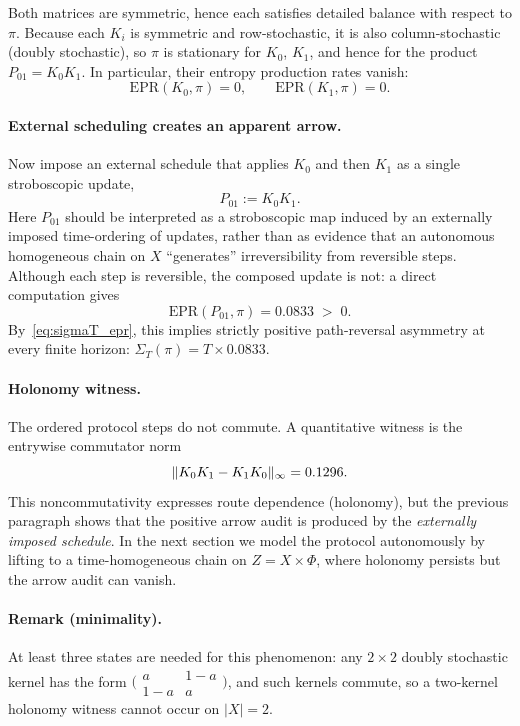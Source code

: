 \documentclass[11pt]{article}
\newcommand{\EprKZero}{0}
\newcommand{\EprKOne}{0}
\newcommand{\EprStrobeRound}{\ensuremath{0.0833}}
\begin{document}
Both matrices are symmetric, hence each satisfies detailed balance with respect to \(\pi\).
Because each \(K_i\) is symmetric and row-stochastic, it is also column-stochastic (doubly stochastic), so \(\pi\) is stationary for \(K_0\), \(K_1\), and hence for the product \(P_{01}=K_0K_1\).
In particular, their entropy production rates vanish:
\[
\mathrm{EPR}(K_0,\pi)=\EprKZero,\qquad
\mathrm{EPR}(K_1,\pi)=\EprKOne.
\]

\paragraph{External scheduling creates an apparent arrow.}
Now impose an external schedule that applies \(K_0\) and then \(K_1\) as a single stroboscopic update,
\[
P_{01}:=K_0K_1.
\]
Here \(P_{01}\) should be interpreted as a stroboscopic map induced by an externally imposed time-ordering of updates, rather than as evidence that an autonomous homogeneous chain on \(X\) ``generates'' irreversibility from reversible steps.
Although each step is reversible, the composed update is not: a direct computation gives
\[
\mathrm{EPR}(P_{01},\pi)=\EprStrobeRound \;>\; 0.
\]
By~\eqref{eq:sigmaT_epr}, this implies strictly positive path-reversal asymmetry at every finite horizon:
\(\Sigma_T(\pi)=T\times\EprStrobeRound\).

\paragraph{Holonomy witness.}
The ordered protocol steps do not commute. A quantitative witness is the entrywise commutator norm
\[
\|K_0K_1-K_1K_0\|_\infty=0.1296.
\]
This noncommutativity expresses route dependence (holonomy), but the previous paragraph shows that the
positive arrow audit is produced by the \emph{externally imposed schedule}. In the next section we model the
protocol autonomously by lifting to a time-homogeneous chain on \(Z=X\times\Phi\), where holonomy persists but the arrow audit can vanish.

\paragraph{Remark (minimality).}
At least three states are needed for this phenomenon: any \(2\times 2\) doubly stochastic kernel has the form \(\bigl(\begin{smallmatrix}a&1-a\\[2pt]1-a&a\end{smallmatrix}\bigr)\), and such kernels commute, so a two-kernel holonomy witness cannot occur on \(|X|=2\).
\end{document}

